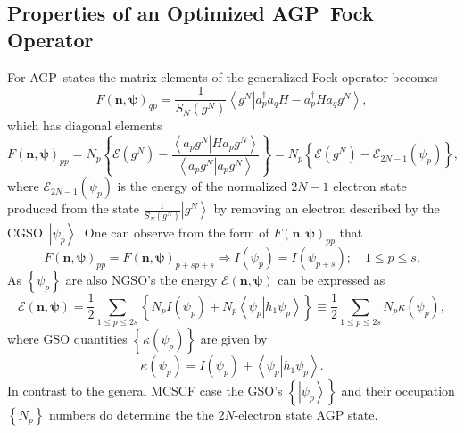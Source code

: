 \documentclass[aps,preprint]{revtex4}%
\begin{document}
\subsection{Properties of an Optimized AGP\ Fock Operator\label{AGP_Fock}}

For AGP\ states the matrix elements of the generalized Fock operator becomes
\begin{equation}
F\left(  \mathbf{n},\mathbf{\psi}\right)  _{qp}=\frac{1}{S_{N}\left(
g^{N}\right)  }\left\langle \left.  g^{N}\right\vert a_{p}^{\dagger}%
a_{q}H-a_{p}^{\dagger}Ha_{q}g^{N}\right\rangle ,
\end{equation}
which has diagonal elements
\begin{equation}
F\left(  \mathbf{n},\mathbf{\psi}\right)  _{pp}=N_{p}\left\{  \mathcal{E}%
\left(  g^{N}\right)  -\frac{\left\langle \left.  a_{p}g^{N}\right\vert
Ha_{p}g^{N}\right\rangle }{\left\langle \left.  a_{p}g^{N}\right\vert
a_{p}g^{N}\right\rangle }\right\}  =N_{p}\left\{  \mathcal{E}\left(
g^{N}\right)  -\mathcal{E}_{2N-1}\left(  \psi_{p}\right)  \right\}  ,
\end{equation}
where $\mathcal{E}_{2N-1}\left(  \psi_{p}\right)  $ is the energy of the
normalized $2N-1$ electron state produced from the state $\frac{1}%
{S_{N}\left(  g^{N}\right)  }\left\vert g^{N}\right\rangle $ by removing an
electron described by the CGSO\ $\left\vert \psi_{p}\right\rangle $. One can
observe from the form of $F\left(  \mathbf{n},\mathbf{\psi}\right)  _{pp}$
that
\begin{equation}
F\left(  \mathbf{n},\mathbf{\psi}\right)  _{pp}=F\left(  \mathbf{n}%
,\mathbf{\psi}\right)  _{p+sp+s}\Rightarrow I\left(  \psi_{p}\right)
=I\left(  \psi_{p+s}\right)  ;\quad1\leq p\leq s.
\end{equation}
As $\left\{  \psi_{p}\right\}  $ are also NGSO's the energy $\mathcal{E}%
\left(  \mathbf{n},\mathbf{\psi}\right)  $ can be expressed as
\begin{equation}
\mathcal{E}\left(  \mathbf{n},\mathbf{\psi}\right)  =\frac{1}{2}\sum_{1\leq
p\leq2s}\left\{  N_{p}I\left(  \psi_{p}\right)  +N_{p}\left\langle \left.
\psi_{p}\right\vert h_{1}\psi_{p}\right\rangle \right\}  \equiv\frac{1}{2}%
{\textstyle\sum\limits_{1\leq p\leq2s}}
N_{p}\kappa\left(  \psi_{p}\right)  ,
\end{equation}
where GSO quantities $\left\{  \kappa\left(  \psi_{p}\right)  \right\}  $ are
given by
\begin{equation}
\kappa\left(  \psi_{p}\right)  =I\left(  \psi_{p}\right)  +\left\langle
\left.  \psi_{p}\right\vert h_{1}\psi_{p}\right\rangle .
\end{equation}
In contrast to the general MCSCF case the GSO's $\left\{  \left\vert \psi
_{p}\right\rangle \right\}  $ and their occupation $\left\{  N_{p}\right\}  $
numbers do determine the the $2N$-electron state AGP state.
\end{document}
